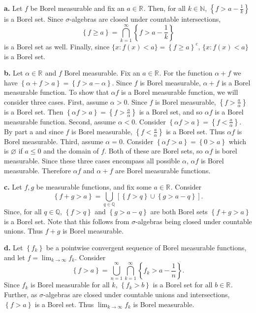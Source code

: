 \begin{solution}
  \textbf{a.} Let $f$ be Borel measurable and fix an $a \in \mathbb{R}^{}$.
  Then, for all $k \in \mathbb{N}$, $\left\{ f > a - \frac{1}{k} \right\}$ is a Borel set.
  Since $\sigma$-algebras are closed under countable intersections,
  \[
  \left\{ f \geq a \right\} = \bigcap_{k=1}^{\infty} \left\{ f > a - \frac{1}{k} \right\}
  \] 
  is a Borel set as well.
  Finally, since $\{x : f(x) < a\} = \left\{ f \geq a \right\}^{c}$, $\{x : f(x) < a\}$ is a Borel set.

  \textbf{b.} Let $\alpha \in \mathbb{R}^{}$ and $f$ Borel measurable.
  Fix an $a \in \mathbb{R}^{}$.
  For the function $\alpha + f$ we have $\left\{ \alpha + f > a \right\} = \left\{ f > a - \alpha \right\}$.
  Since $f$ is Borel measurable, $\alpha + f$ is a Borel measurable function.
  To show that $\alpha f$ is a Borel measurable function, we will consider three cases.
  First, assume $\alpha > 0$.
  Since $f$ is Borel measurable, $\left\{ f > \frac{a}{\alpha} \right\}$ is a Borel set.
  Then $ \left\{ \alpha f > a \right\} = \left\{ f > \frac{a}{\alpha} \right\}$ is a Borel set, and so $\alpha f$ is a Borel measurable function.
  Second, assume $\alpha < 0$.
  Consider $\left\{ \alpha f > a \right\} = \left\{ f < \frac{a}{\alpha} \right\}$.
  By part a and since $f$ is Borel measurable, $\left\{ f < \frac{a}{\alpha} \right\}$ is a Borel set.
  Thus $\alpha f$ is Borel measurable.
  Third, assume $\alpha = 0$.
  Consider $\left\{ \alpha f > a \right\} = \left\{ 0 > a \right\}$ which is $\varnothing$ if $a \leq 0$ and the domain of $f$.
  Both of these are Borel sets, so $\alpha f$ is borel measurable.
  Since these three cases encompass all possible $\alpha$, $\alpha f$ is Borel measurable.
  Therefore $\alpha f$ and $\alpha + f$ are Borel measurable functions.

  \textbf{c.} Let $f,g$ be measurable functions, and fix some $a \in \mathbb{R}^{}$.
  Consider 
   \[
   \left\{ f + g > a \right\} = \bigcup_{q \in \mathbb{Q}} \left[ \left\{ f > q \right\} \cup \left\{ g > a - q \right\} \right] 
   .\] 
   Since, for all $q \in \mathbb{Q}$, $\left\{ f > q \right\}$ and $\left\{ g > a - q \right\}$ are both Borel sets $\left\{ f + g > a \right\}$ is a Borel set.
   Note that this follows from $\sigma$-algebras being closed under countable unions.
   Thus $f + g$ is Borel measurable.

   \textbf{d.} Let $\left\{ f_{k} \right\}$ be a pointwise convergent sequence of Borel measurable functions, and let $f = \lim_{k \to \infty} f_{k}$.
   Consider  
   \[
   \left\{ f > a \right\} = \bigcup_{n=1}^{\infty}  \bigcap_{k = 1}^{\infty} \left\{ f_{k} > a - \frac{1}{n} \right\}
   .\] 
   Since $f_{k}$ is Borel measurable for all $k$, $\left\{ f_{k} > b \right\}$ is a Borel set for all $b \in \mathbb{R}^{}$.
   Further, as $\sigma$-algebras are closed under countable unions and intersections,  $\left\{ f > a \right\}$ is a Borel set.
   Thus $\lim_{k \to \infty} f_{k}$ is Borel measurable.

\end{solution}

